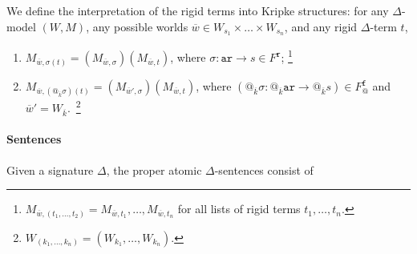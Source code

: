 \documentclass{article}
\newcommand{\ari}{\mathtt{ar}}
\newcommand{\rigid}{\mathtt{r}}
\newcommand{\flexible}{\mathtt{f}}
\newcommand{\ok}{{\overline k}}
\newcommand{\ow}{{\overline w}}
\begin{document}
 We define the interpretation of the rigid terms into Kripke structures:
 for any $\Delta$-model $(W,M)$, any possible worlds $\ow\in W_{s_1}\times\dots\times W_{s_n}$, and any rigid $\Delta$-term $t$, 
 \begin{enumerate}
  \item $M_{\ow,\sigma(t)} = (M_{\ow,\sigma})(M_{\ow,t})$, where $\sigma\colon\ari\to s\in F^\rigid$;
  \footnote{$M_{\ow,(t_1,\ldots,t_2)}=M_{\ow,t_1},\ldots,M_{\ow,{t_n}}$ for all lists of rigid terms $t_1,\ldots,t_n$.}
  
   \item $M_{\ow,(@_\ok \sigma)(t)} = (M_{\ow',\sigma}) (M_{\ow,t})$, where $(@_\ok \sigma\colon @_\ok \ari\to @_\ok s)\in F_@^\flexible$ and $\ow'=W_{\ok}$.~\footnote{$W_{(k_1,\dots,k_n)}=(W_{k_1},\dots,W_{k_n})$.}
 \end{enumerate}

\paragraph{Sentences} 
Given a signature $\Delta$, the proper atomic $\Delta$-sentences consist of
 
\end{document}

